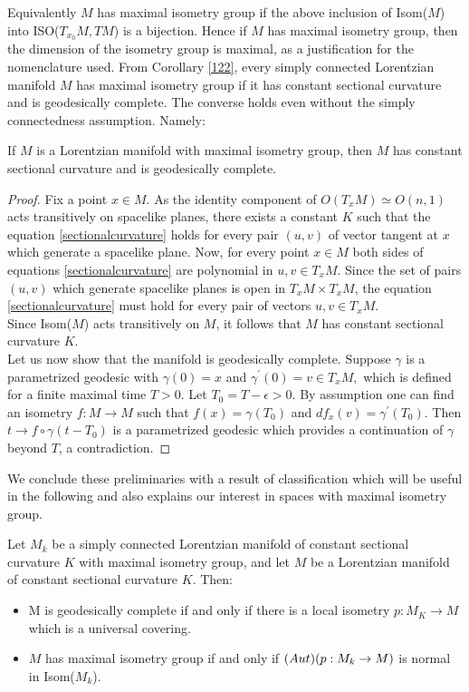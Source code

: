 Equivalently $M$ has maximal isometry group if the above inclusion of Isom($M$) into ISO($T_{x_0}M, TM$) is a bijection. Hence if $M$ has maximal isometry group, then the dimension of the isometry group is maximal, as a justification for the nomenclature used. 
From Corollary \ref{122}, every simply connected Lorentzian manifold $M$ has maximal isometry group if it has constant sectional curvature and is geodesically complete. The converse holds even without the simply connectedness assumption. Namely: 

\begin{lemma}\label{maximalisometry}
    If $M$ is a Lorentzian manifold with maximal isometry group, then $M$ has constant sectional curvature and is geodesically complete.
\end{lemma}

\begin{proof}
    Fix a point $x\in M$. As the identity component of $O(T_x M)\simeq O(n,1)$ acts transitively on spacelike planes, there exists a constant $K$ such that the equation \ref{sectionalcurvature} holds for every pair $(u,v)$ of vector tangent at $x$ which generate a spacelike plane. Now, for every point $x\in M$ both sides of equations \ref{sectionalcurvature} are polynomial in $u,v \in T_xM$. Since the set of pairs $(u,v)$ which generate spacelike planes is open in $T_{x}M\times T_{x}M$, the equation \ref{sectionalcurvature} must hold for every pair of vectors $u,v \in T_xM$.\\ Since Isom($M$) acts transitively on $M$, it follows that $M$ has constant sectional curvature $K$.\\
    Let us now show that the manifold is geodesically complete. Suppose $\gamma$ is a parametrized geodesic with $\gamma(0)=x$ and $\gamma^{\prime} (0)=v\in T_xM,$ which is defined for a finite maximal time $T>0.$ Let $T_0=T-\epsilon>0.$ By assumption one can find an isometry $f:M\to M$ such that $f(x)=\gamma(T_0)$ and $df_x(v)=\gamma^{\prime}(T_0).$ Then $t\to f\circ\gamma(t-T_0)$ is a parametrized geodesic which provides a continuation of $\gamma$ beyond $T$, a contradiction. 
\end{proof}

We conclude these preliminaries with a result of classification which will be useful in the following and also explains our interest in spaces with maximal isometry group.
\begin{proposition}\label{classification}
    Let $M_k$ be a simply connected Lorentzian manifold of constant sectional curvature $K$ with maximal isometry group, and let $M$ be a Lorentzian manifold of constant sectional curvature $K$. Then: 
    \begin{itemize}
        \item M is geodesically complete if and only if there is a local isometry $p:M_K\to M$ which is a universal covering.
        \item $M$ has maximal isometry group if and only if $\text(Aut)(p:M_k\to M)$ is normal in Isom($M_k$). 
    \end{itemize}
\end{proposition}

